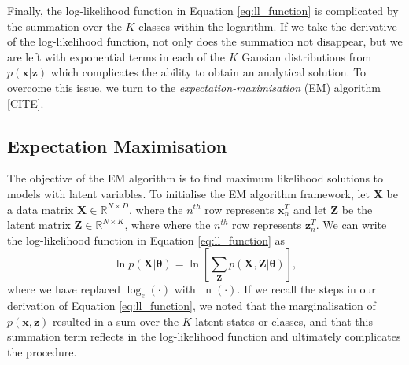 \documentclass{article}
\begin{document}
Finally, the log-likelihood function in Equation \eqref{eq:ll_function} is complicated by the summation over the $K$ classes within the logarithm. If we take the derivative of the log-likelihood function, not only does the summation not disappear, but we are left with exponential terms in each of the $K$ Gausian distributions from $p(\mathbf{x}\vert\mathbf{z})$ which complicates the ability to obtain an analytical solution. To overcome this issue, we turn to the \emph{expectation-maximisation} (EM) algorithm [CITE].

\subsection{Expectation Maximisation}

The objective of the EM algorithm is to find maximum likelihood solutions to models with latent variables. To initialise the EM algorithm framework, let $\mathbf{X}$ be a data matrix $\mathbf{X}\in \mathbb{R}^{N \times D}$, where the $n^{th}$ row represents $\mathbf{x}_n^T$ and let $\mathbf{Z}$ be the latent matrix $\mathbf{Z}\in \mathbb{R}^{N \times K}$, where where the $n^{th}$ row represents $\mathbf{z}_n^T$. We can write the log-likelihood function in Equation \eqref{eq:ll_function} as
\begin{equation}
\ln p(\mathbf{X}\vert \boldsymbol\theta) = \ln \left[ \sum_{\mathbf{Z}} p(\mathbf{X}, \mathbf{Z}\vert \boldsymbol\theta) \right],
\end{equation}
where we have replaced $\log_e(\cdot)$ with $\ln(\cdot)$. If we recall the steps in our derivation of Equation \eqref{eq:ll_function}, we noted that the marginalisation of $p(\mathbf{x}, \mathbf{z})$ resulted in a sum over the $K$ latent states or classes, and that this summation term reflects in the log-likelihood function and ultimately complicates the procedure. 
\end{document}
